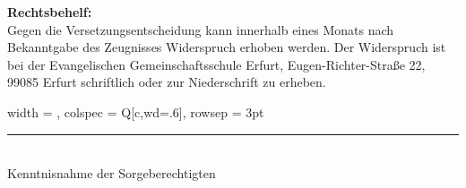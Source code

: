 {\begin{minipage}[t][.99\textheight][t]{.97\textwidth}
		\vfill
		
		{\footnotesize
			\textbf{Rechtsbehelf:}\\
			Gegen die Versetzungsentscheidung kann innerhalb eines Monats nach
			Bekanntgabe des Zeugnisses Widerspruch erhoben werden. Der Widerspruch
			ist bei der Evangelischen Gemeinschaftsschule Erfurt,
			Eugen-Richter-Straße 22, 99085 Erfurt schriftlich oder zur Niederschrift
			zu erheben.\\[3em]
			
			\begin{tblr}{
					width   = \linewidth,
					colspec = {Q[c,wd=.6\linewidth]},
					rowsep  = 3pt
				}
				\rule{\linewidth}{1pt}\\[-.3ex]
				{\centering Kenntnisnahme der Sorgeberechtigten}
			\end{tblr}
		}
	\end{minipage}%
}%
